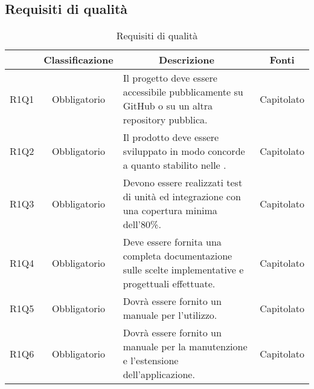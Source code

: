 \subsection{Requisiti di qualità} \label{subsection:requisiti_qualita}
\begin{table}[H]
    \centering
    \renewcommand{\arraystretch}{1.8}
    \begin{tabular}{c | c | p{6cm} | c}
        \rowcolor[HTML]{125E28}
        \multicolumn{1}{c}{\color[HTML]{FFFFFF} \textbf{Codice}}          &
        \multicolumn{1}{c}{\color[HTML]{FFFFFF} \textbf{Classificazione}} &
        \multicolumn{1}{c}{\color[HTML]{FFFFFF} \textbf{Descrizione}}     &
        \multicolumn{1}{c}{\color[HTML]{FFFFFF} \textbf{Fonti}}                                                                                                                                                    \\
        \hline
        R1Q1                                                              & Obbligatorio & Il progetto deve essere accessibile pubblicamente su GitHub\glo{} o su un altra repository\glo{} pubblica. & Capitolato \\
        R1Q2                                                              & Obbligatorio & Il prodotto deve essere sviluppato in modo concorde a quanto stabilito nelle \docNameNdP{}.                & Capitolato \\
        R1Q3                                                              & Obbligatorio & Devono essere realizzati test di unità ed integrazione con una copertura minima dell'80\%.                 & Capitolato \\
        R1Q4                                                              & Obbligatorio & Deve essere fornita una completa documentazione sulle scelte implementative e progettuali effettuate.      & Capitolato \\
        R1Q5                                                              & Obbligatorio & Dovrà essere fornito un manuale per l'utilizzo.                                                            & Capitolato \\
        R1Q6                                                              & Obbligatorio & Dovrà essere fornito un manuale per la manutenzione e l'estensione dell'applicazione.                      & Capitolato \\
    \end{tabular}
    \caption{Requisiti di qualità}
\end{table}

